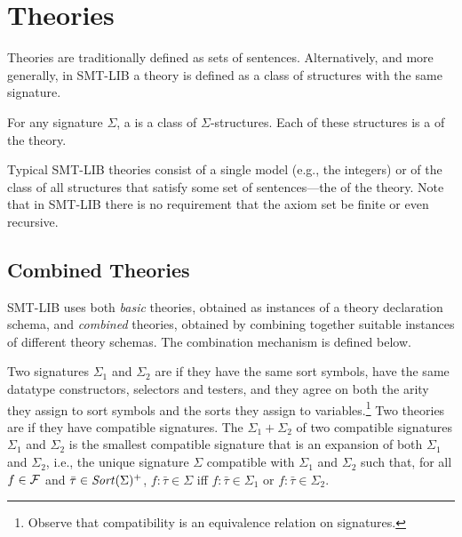 \section{Theories} \label{sec:theories}

Theories are traditionally defined as sets of sentences.
Alternatively, and more generally, 
in SMT-LIB a theory is defined as a class of structures with the same signature.

\begin{definition}[Theory]
For any signature $\Sigma$,
a  is a class of $\Sigma$-structures.
Each of these structures is a  of the theory.
\end{definition}

Typical SMT-LIB theories consist of a single model 
(e.g., the integers)
or 
of the class of all structures that satisfy some set of sentences---the
 of the theory.
Note that in SMT-LIB there is no requirement that the axiom set be
finite or even recursive.


\subsection{Combined Theories} \label{sec:comb-theories}

SMT-LIB uses both \emph{basic} theories, 
obtained as instances of a theory declaration schema,
and \emph{combined} theories, obtained by combining together
suitable instances of different theory sche\-mas.
The combination mechanism is defined below.

Two signatures $\Sigma_1$ and $\Sigma_2$ are  
if they have the same sort symbols, 
have the same datatype constructors, selectors and testers, and they agree 
on both the arity they assign to sort symbols and 
the sorts they assign to variables.\footnote{%
Observe that compatibility is an equivalence relation on signatures.
}
Two theories are  if they have compatible signatures.
The  $\Sigma_1 + \Sigma_2$
of two compatible signatures $\Sigma_1$ and $\Sigma_2$
is the smallest compatible signature
that is an expansion of both $\Sigma_1$ and $\Sigma_2$,
i.e., the unique signature $\Sigma$ compatible 
with $\Sigma_1$ and $\Sigma_2$ such that,
for all $f \in \mathcal{F}$ and $\bar{\tau} \in \mathit{Sort}(\Sigma)^+$,
$f{:}\bar{\tau} \in \Sigma$ iff 
$f{:}\bar{\tau} \in \Sigma_1$ or
$f{:}\bar{\tau} \in \Sigma_2$.

